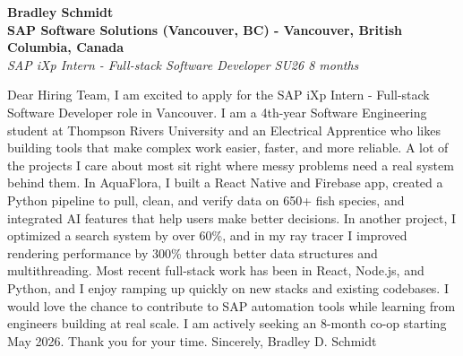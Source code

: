 \documentclass[11pt]{article}
\begin{document}
\textbf{Bradley Schmidt}\\
\vspace{0.5em}
\textbf{SAP Software Solutions (Vancouver, BC) - Vancouver, British Columbia, Canada}\\
\textit{SAP iXp Intern - Full-stack Software Developer SU26 8 months}

Dear Hiring Team, I am excited to apply for the SAP iXp Intern - Full-stack Software Developer role in Vancouver. I am a 4th-year Software Engineering student at Thompson Rivers University and an Electrical Apprentice who likes building tools that make complex work easier, faster, and more reliable. A lot of the projects I care about most sit right where messy problems need a real system behind them. In AquaFlora, I built a React Native and Firebase app, created a Python pipeline to pull, clean, and verify data on 650+ fish species, and integrated AI features that help users make better decisions. In another project, I optimized a search system by over 60\%, and in my ray tracer I improved rendering performance by 300\% through better data structures and multithreading. Most recent full-stack work has been in React, Node.js, and Python, and I enjoy ramping up quickly on new stacks and existing codebases. I would love the chance to contribute to SAP automation tools while learning from engineers building at real scale. I am actively seeking an 8-month co-op starting May 2026. Thank you for your time. Sincerely, Bradley D. Schmidt
\end{document}

